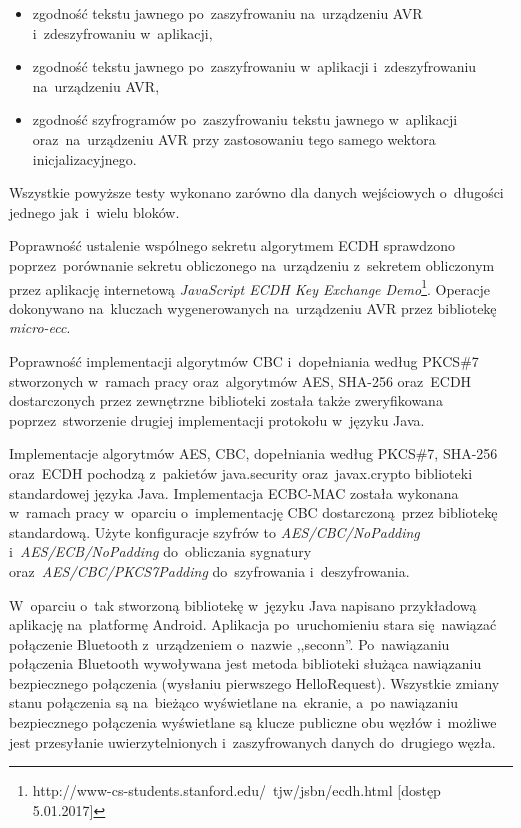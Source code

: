 \begin{itemize}
    \item zgodność tekstu jawnego po~zaszyfrowaniu na~urządzeniu AVR i~zdeszyfrowaniu w~aplikacji,
    \item zgodność tekstu jawnego po~zaszyfrowaniu w~aplikacji i~zdeszyfrowaniu na~urządzeniu AVR,
    \item zgodność szyfrogramów po~zaszyfrowaniu tekstu jawnego w~aplikacji oraz~na~urządzeniu AVR przy zastosowaniu tego samego wektora inicjalizacyjnego.
\end{itemize}

Wszystkie powyższe testy wykonano zarówno dla danych wejściowych o~długości jednego jak~i~wielu bloków.

Poprawność ustalenie wspólnego sekretu algorytmem ECDH sprawdzono poprzez~porównanie sekretu obliczonego na~urządzeniu z~sekretem obliczonym przez aplikację internetową \emph{JavaScript ECDH Key Exchange Demo}\footnote{http://www-cs-students.stanford.edu/~tjw/jsbn/ecdh.html [dostęp 5.01.2017]}. Operacje dokonywano na~kluczach wygenerowanych na~urządzeniu AVR przez bibliotekę \emph{micro-ecc}.

Poprawność implementacji algorytmów CBC i~dopełniania według PKCS\#7 stworzonych w~ramach pracy oraz~algorytmów AES, SHA-256 oraz~ECDH dostarczonych przez zewnętrzne biblioteki została także zweryfikowana poprzez~stworzenie drugiej implementacji protokołu w~języku Java.

Implementacje algorytmów AES, CBC, dopełniania według PKCS\#7, SHA-256 oraz~ECDH pochodzą z~pakietów java.security oraz~javax.crypto biblioteki standardowej języka Java. Implementacja ECBC-MAC została wykonana w~ramach pracy w~oparciu o~implementację CBC dostarczoną przez bibliotekę standardową. Użyte konfiguracje szyfrów to \emph{AES/CBC/NoPadding} i~\emph{AES/ECB/NoPadding} do~obliczania sygnatury oraz~\emph{AES/CBC/PKCS7Padding} do~szyfrowania i~deszyfrowania.

W~oparciu o~tak stworzoną bibliotekę w~języku Java napisano przykładową aplikację na~platformę Android. Aplikacja po~uruchomieniu stara się nawiązać połączenie Bluetooth z~urządzeniem o~nazwie ,,seconn''. Po~nawiązaniu połączenia Bluetooth wywoływana jest metoda biblioteki służąca nawiązaniu bezpiecznego połączenia (wysłaniu pierwszego HelloRequest). Wszystkie zmiany stanu połączenia są na~bieżąco wyświetlane na~ekranie, a~po nawiązaniu bezpiecznego połączenia wyświetlane są klucze publiczne obu węzłów i~możliwe jest przesyłanie uwierzytelnionych i~zaszyfrowanych danych do~drugiego węzła.


